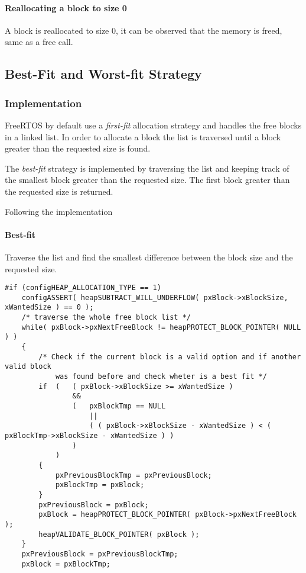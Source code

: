     \paragraph{Reallocating a block to size 0}
    A block is reallocated to size 0, it can be observed that the memory is freed, same as a free call.

\subsection{Best-Fit and Worst-fit Strategy}
    \subsubsection{Implementation}
    FreeRTOS by default use a \textit{first-fit} allocation strategy and handles the free blocks in a linked list. In order to allocate a block the list is traversed until a block greater than the requested size is found. 

    The \textit{best-fit} strategy is implemented by traversing the list and keeping track of the smallest block greater than the requested size. The first block greater than the requested size is returned.

    Following the implementation

    \paragraph{Best-fit} Traverse the list and find the smallest difference between the block size and the requested size.

    \begin{codebox}
    \begin{lstlisting}
#if (configHEAP_ALLOCATION_TYPE == 1)
    configASSERT( heapSUBTRACT_WILL_UNDERFLOW( pxBlock->xBlockSize, xWantedSize ) == 0 );
    /* traverse the whole free block list */
    while( pxBlock->pxNextFreeBlock != heapPROTECT_BLOCK_POINTER( NULL ) )
    {
        /* Check if the current block is a valid option and if another valid block
            was found before and check wheter is a best fit */
        if  (   ( pxBlock->xBlockSize >= xWantedSize )
                &&
                (   pxBlockTmp == NULL
                    ||
                    ( ( pxBlock->xBlockSize - xWantedSize ) < ( pxBlockTmp->xBlockSize - xWantedSize ) )
                )
            )
        {
            pxPreviousBlockTmp = pxPreviousBlock;
            pxBlockTmp = pxBlock;
        }
        pxPreviousBlock = pxBlock;
        pxBlock = heapPROTECT_BLOCK_POINTER( pxBlock->pxNextFreeBlock );
        heapVALIDATE_BLOCK_POINTER( pxBlock );
    }
    pxPreviousBlock = pxPreviousBlockTmp;
    pxBlock = pxBlockTmp;
    \end{lstlisting}
    \end{codebox}


